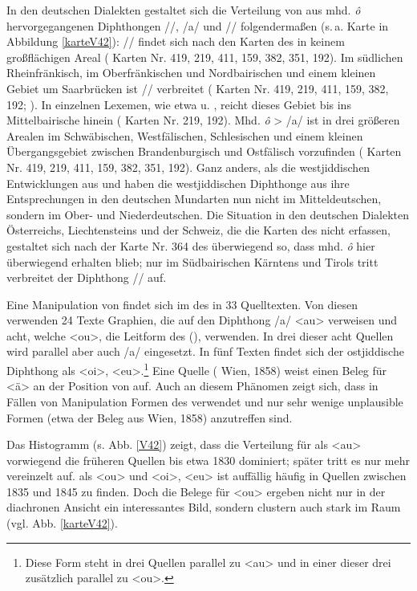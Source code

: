  In den deutschen Dialekten gestaltet sich die Verteilung von aus mhd. \textit{ô} hervorgegangenen Diphthongen  /\textopeno {}/, /a/ und  /\textopeno \textsubarch{\textsci}/ folgendermaßen (s.\,a. Karte in Abbildung \ref{karteV42}): /\textopeno \textsubarch{\textsci}/ findet sich nach den Karten des  in keinem großflächigen  Areal ( Karten Nr. 419, 219, 411, 159, 382, 351, 192). Im südlichen Rheinfränkisch, im Oberfränkischen und Nordbairischen und einem kleinen Gebiet um Saarbrücken ist /\textopeno {}/ verbreitet ( Karten Nr. 419, 219, 411, 159, 382, 192;  \cite[237]{Schirmunski1962}). In einzelnen Lexemen, wie etwa  u. , reicht dieses Gebiet bis ins Mittelbairische hinein ( Karten Nr. 219, 192). Mhd. \textit{ô} > /a/ ist in drei größeren Arealen im Schwäbischen, Westfälischen, Schlesischen und einem kleinen Übergangsgebiet zwischen Brandenburgisch und Ostfälisch vorzufinden ( Karten Nr. 419, 219, 411, 159, 382, 351, 192). Ganz anders, als die westjiddischen Entwicklungen aus  und  haben die westjiddischen Diphthonge aus  ihre Entsprechungen in den deutschen Mundarten nun nicht im Mitteldeutschen, sondern im Ober- und Niederdeutschen. Die Situation in den deutschen Dialekten Österreichs, Liechtensteins und der Schweiz, die die Karten des  nicht erfassen, gestaltet sich nach der Karte Nr. 364 des  überwiegend so, dass mhd. \textit{ô} hier überwiegend erhalten blieb; nur im Südbairischen Kärntens und Tirols tritt verbreitet der Diphthong /\textopeno {}/ auf.

Eine Manipulation von  findet sich im  des  in 33 Quelltexten. Von diesen verwenden 24 Texte Graphien, die auf den Diphthong /a/ <au> verweisen und acht, welche <ou>, die Leitform des  (\cite[79]{Herzog1992}), verwenden. In drei dieser acht Quellen wird  parallel  aber auch /a/ eingesetzt. In fünf Texten findet sich der ostjiddische Diphthong als <oi>, <eu>.\footnote{Diese Form steht in drei Quellen parallel zu <au> und in einer dieser drei zusätzlich parallel zu <ou>.} Eine Quelle ( Wien, 1858) weist einen Beleg für <ä> an der Position von  auf. Auch an diesem Phänomen zeigt sich, dass  in Fällen von Manipulation Formen des  verwendet und nur sehr wenige unplausible Formen (etwa der Beleg aus  Wien, 1858) anzutreffen sind. 


Das Histogramm (s. Abb. \ref{V42}) zeigt, dass die Verteilung für  als <au> vorwiegend die früheren Quellen bis etwa 1830 dominiert; später tritt es nur mehr vereinzelt auf.  als <ou> und <oi>, <eu> ist auffällig häufig in Quellen zwischen 1835 und 1845 zu finden. Doch die Belege für <ou> ergeben nicht nur in der diachronen Ansicht ein interessantes Bild, sondern clustern auch stark im Raum (vgl. Abb. \ref{karteV42}).\\


